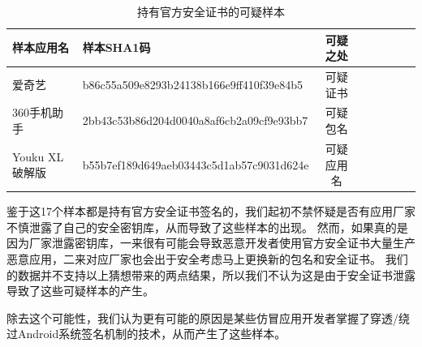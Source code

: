 \begin{table}[htbp]
	\renewcommand{\arraystretch}{1}
	\small
	\centering
  \setlength{\belowcaptionskip}{-10pt}
	\caption{持有官方安全证书的可疑样本}
	\begin{tabular}{l l c c c c c c}
		\toprule
		{\bf 样本应用名} & {\bf 样本SHA1码} & {\bf 可疑之处} \\
		\midrule
		爱奇艺 & b86c55a509e8293b24138b166e9ff410f39e84b5 & 可疑证书\\
		\rowcolor{gray!15} 360手机助手 & 2bb43c53b86d204d0040a8af6cb2a09cf9e93bb7 & 可疑包名\\
		Youku XL 破解版 & b55b7ef189d649aeb03443c5d1ab57c9031d624e & 可疑应用名 \\
		\bottomrule
	\end{tabular}
	\label{table:suspicious_samples}
\end{table}

鉴于这17个样本都是持有官方安全证书签名的，我们起初不禁怀疑是否有应用厂家不慎泄露了自己的安全密钥库，从而导致了这些样本的出现。
然而，如果真的是因为厂家泄露密钥库，一来很有可能会导致恶意开发者使用官方安全证书大量生产恶意应用，二来对应厂家也会出于安全考虑马上更换新的包名和安全证书。
我们的数据并不支持以上猜想带来的两点结果，所以我们不认为这是由于安全证书泄露导致了这些可疑样本的产生。

除去这个可能性，我们认为更有可能的原因是某些仿冒应用开发者掌握了穿透/绕过Android系统签名机制的技术，从而产生了这些样本。

